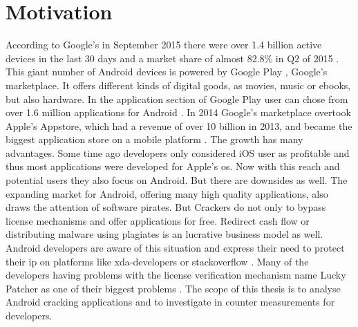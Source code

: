 \section{Motivation}\label{section:introduction-motivation}
According to Google's in September 2015 there were over 1.4 billion active devices in the last 30 days and a market share of almost 82.8\% in Q2 of 2015 \cite{androidDevices}\cite{androidShare}.
This giant number of Android devices is powered by Google Play \cite{googlePlay}, Google's marketplace.
It offers different kinds of digital goods, as movies, music or ebooks, but also hardware.
In the application section of Google Play user can chose from over 1.6 million applications for Android \cite{statistaAppStore}.
In 2014 Google's marketplace overtook Apple's Appstore, which had a revenue of over 10 billion in 2013, and became the biggest application store on a mobile platform \cite{wiwoValue}.
\newline
The growth has many advantages.
Some time ago developers only considered iOS user as profitable and thus most applications were developed for Apple's \gls{os}.
Now with this reach and potential users they also focus on Android\cite{businessProfit}.
But there are downsides as well.
The expanding market for Android, offering many high quality applications, also draws the attention of software pirates.
But Crackers do not only to bypass license mechanisms and offer applications for free.
Redirect cash flow or distributing malware using plagiates is an lucrative business model as well.
Android developers are aware of this situation \cite{developersPiracy} and express their need to protect their \gls{ip} on platforms like xda-developers \cite{xdaPiracy} or stackoverflow \cite{stackoverflowPiracy}.
Many of the developers having problems with the license verification mechanism name Lucky Patcher as one of their biggest problems \cite{stackoverflowLucky}.
\newline
\newline
The scope of this thesis is to analyse Android cracking applications and to investigate in counter measurements for developers.




